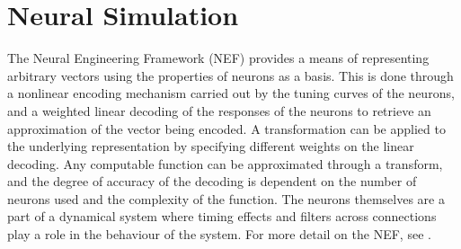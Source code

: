 \documentclass[letterpaper,12pt,titlepage,oneside,final]{book}
\begin{document}
\section{Neural Simulation}




The Neural Engineering Framework (NEF)\cite{eliasmith2004neural} provides a means of representing arbitrary vectors using the properties of neurons as a basis.
This is done through a nonlinear encoding mechanism carried out by the tuning curves of the neurons, and a weighted linear decoding of the responses of the neurons to retrieve an approximation of the vector being encoded.
A transformation can be applied to the underlying representation by specifying different weights on the linear decoding.
Any computable function can be approximated through a transform, and the degree of accuracy of the decoding is dependent on the number of neurons used and the complexity of the function.
The neurons themselves are a part of a dynamical system where timing effects and filters across connections play a role in the behaviour of the system. 
For more detail on the NEF, see \cite{eliasmith2007build, stewart2011neural, eliasmith2013build}. %
\end{document}
